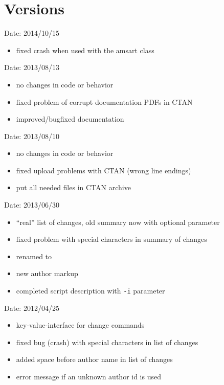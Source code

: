 \section{Versions}
\label{sec:versions}


Date: 2014/10/15
\begin{itemize}
	\item fixed crash when used with the amsart class
\end{itemize}


Date: 2013/08/13
\begin{itemize}
	\item no changes in code or behavior
	\item fixed problem of corrupt documentation PDFs in CTAN
	\item improved/bugfixed documentation
\end{itemize}


Date: 2013/08/10
\begin{itemize}
	\item no changes in code or behavior
	\item fixed upload problems with CTAN (wrong line endings)
	\item put all needed files in CTAN archive
\end{itemize}


Date: 2013/06/30
\begin{itemize}
	\item ``real'' list of changes, old summary now with optional parameter 
	\item fixed problem with special characters in summary of changes
	\item renamed  to 
	\item new author markup 
	\item completed script description with \texttt{-i} parameter
\end{itemize}


Date: 2012/04/25
\begin{itemize}
	\item key-value-interface for change commands
	\item fixed bug (crash) with special characters in list of changes
	\item added space before author name in list of changes
	\item error message if an unknown author id is used
\end{itemize}

